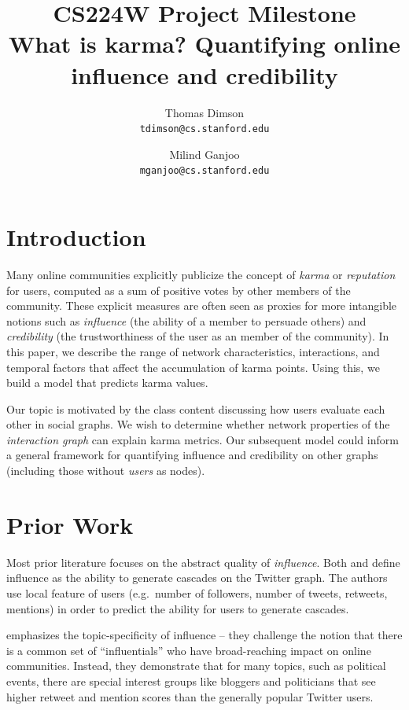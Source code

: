 \documentclass[10pt]{article}
\title{{\large CS224W Project Milestone} \\
  What is karma? Quantifying online influence and credibility
}
\author{Thomas Dimson \\ {\tt tdimson@cs.stanford.edu}
  \and
  Milind Ganjoo \\ {\tt mganjoo@cs.stanford.edu}
}
\date{}
\begin{document}
\maketitle

\section{Introduction}

Many online communities explicitly publicize the concept of \textit{karma} or
\textit{reputation} for users, computed as a sum of positive votes by other members of
the community. These explicit measures are often seen as proxies for more
intangible notions such as \textit{influence} (the ability of a member to
persuade others) and \textit{credibility} (the trustworthiness of the user as an
member of the community). In this paper, we describe the range of network
characteristics, interactions, and temporal factors that affect the accumulation
of karma points. Using this, we build a model that predicts karma values.

Our topic is motivated by the class content discussing how users evaluate
each other in social graphs. We wish to determine whether network properties of the 
\textit{interaction graph} can explain karma metrics. Our subsequent model 
could inform a general framework for quantifying influence and credibility
on other graphs (including those without \textit{users} as nodes).

\section{Prior Work}

Most prior literature focuses on the abstract quality of \textit{influence}.
Both \citet{bakshy2011everyone} and \citet{cha2010measuring} define
influence as the ability to generate cascades on the Twitter graph. The authors
use local feature of users (e.g.\ number of followers, number of tweets,
retweets, mentions) in order to predict the ability for users to generate
cascades.

\citet{cha2010measuring} emphasizes the topic-specificity of influence -- they challenge
the notion that there is a common set of ``influentials'' who have
broad-reaching impact on online communities. Instead, they demonstrate that for
many topics, such as political events, there are special interest groups like
bloggers and politicians that see higher retweet and mention scores than the
generally popular Twitter users.
\end{document}
